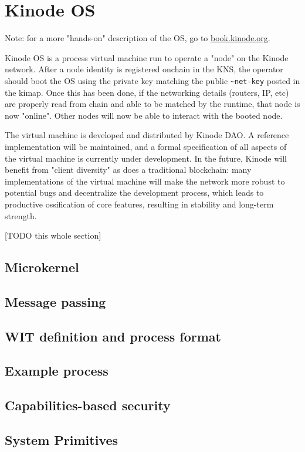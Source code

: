 \documentclass[runningheads]{llncs}
\begin{document}
%
%
%
\section{Kinode OS}

Note: for a more "hands-on" description of the OS, go to \href{https://book.kinode.org/r}{book.kinode.org}.

Kinode OS is a process virtual machine run to operate a "node" on the Kinode network.
After a node identity is registered onchain in the KNS, the operator should boot the OS using the private key matching the public \verb|~net-key| posted in the kimap.
Once this has been done, if the networking details (routers, IP, etc) are properly read from chain and able to be matched by the runtime, that node is now "online".
Other nodes will now be able to interact with the booted node.

The virtual machine is developed and distributed by Kinode DAO.
A reference implementation will be maintained, and a formal specification of all aspects of the virtual machine is currently under development.
In the future, Kinode will benefit from "client diversity" as does a traditional blockchain: many implementations of the virtual machine will make the network more robust to potential bugs and decentralize the development process, which leads to productive ossification of core features, resulting in stability and long-term strength.

[TODO this whole section]

\subsection{Microkernel}
\subsection{Message passing}
\subsection{WIT definition and process format}
\subsection{Example process}
\subsection{Capabilities-based security}
\subsection{System Primitives}
\end{document}
